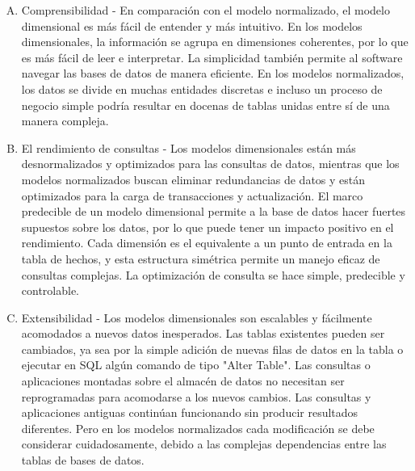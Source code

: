 \documentclass[11pt,a4paper]{article}
\begin{document}
	 	\begin{enumerate}[A.]
	 		\item Comprensibilidad - En comparación con el modelo normalizado, el modelo dimensional es más fácil de entender y más intuitivo. En los modelos dimensionales, la información se agrupa en dimensiones coherentes, por lo que es más fácil de leer e interpretar. La simplicidad también permite al software navegar las bases de datos de manera eficiente. En los modelos normalizados, los datos se divide en muchas entidades discretas e incluso un proceso de negocio simple podría resultar en docenas de tablas unidas entre sí de una manera compleja.
	 		\item El rendimiento de consultas - Los modelos dimensionales están más desnormalizados y optimizados para las consultas de datos, mientras que los modelos normalizados buscan eliminar redundancias de datos y están optimizados para la carga de transacciones y actualización. El marco predecible de un modelo dimensional permite a la base de datos hacer fuertes supuestos sobre los datos, por lo que puede tener un impacto positivo en el rendimiento. Cada dimensión es el equivalente a un punto de entrada en la tabla de hechos, y esta estructura simétrica permite un manejo eficaz de consultas complejas. La optimización de consulta se hace simple, predecible y controlable.
	 		\item Extensibilidad - Los modelos dimensionales son escalables y fácilmente acomodados a nuevos datos inesperados. Las tablas existentes pueden ser cambiados, ya sea por la simple adición de nuevas filas de datos en la tabla o ejecutar en SQL algún comando de tipo "Alter Table". Las consultas o aplicaciones montadas sobre el almacén de datos no necesitan ser reprogramadas para acomodarse a los nuevos cambios. Las consultas y aplicaciones antiguas continúan funcionando sin producir resultados diferentes. Pero en los modelos normalizados cada modificación se debe considerar cuidadosamente, debido a las complejas dependencias entre las tablas de bases de datos.
	 	\end{enumerate}
	
		
	 	
	 	
	
	
	
	
\end{document}
